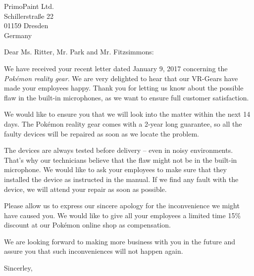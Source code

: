 \begin{letter}{
PrimoPaint Ltd.\\
Schillerstraße 22\\
01159 Dresden\\
Germany

}
\opening{Dear Ms. Ritter, Mr. Park and Mr. Fitzsimmons:}

We have received your recent letter dated January 9, 2017 concerning the \emph{Pokémon reality gear}. We are very delighted to hear that our VR-Gears have made your employees happy. Thank you for letting us know about the possible flaw in the built-in microphones, as we want to ensure full customer satisfaction. 

	We would like to ensure you that we will look into the matter within the next 14 days. The Pokémon reality gear comes with a 2-year long guarantee, so all the faulty devices will be repaired as soon as we locate the problem. 
	
	The devices are always tested before delivery -- even in noisy environments. That's why our technicians believe that the flaw might not be in the built-in microphone. We would like to ask your employees to make sure that they installed the device as instructed in the manual. If we find any fault with the device, we will attend your repair as soon as possible.
	
	Please allow us to express our sincere apology for the inconvenience we might have caused you. We would like to give all your employees a limited time 15\% discount at our Pokémon online shop as compensation.
	
	We are looking forward to making more business with you in the future and assure you that such inconveniences will not happen again.

\closing{Sincerley,}
\end{letter}

